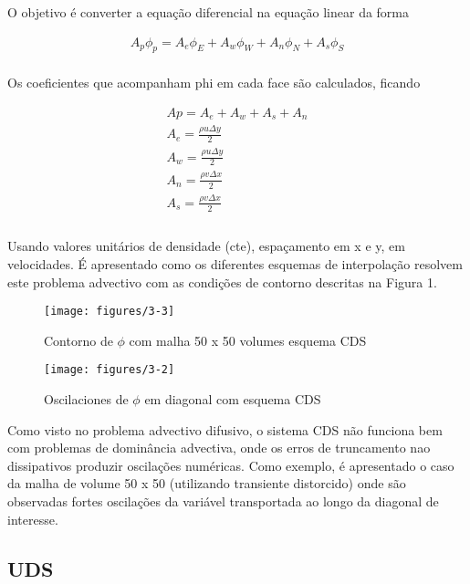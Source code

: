 \documentclass[]{article}
\begin{document}
O objetivo é converter a equação diferencial na equação linear da forma

\begin{equation}
	\begin{aligned}
		A_p\phi_p= A_e\phi_E + A_w\phi_W + A_n\phi_N + A_s\phi_S 
	\end{aligned}
\end{equation}\\

Os coeficientes que acompanham phi em cada face são calculados, ficando

\begin{equation}
	\begin{aligned}
		Ap = A_e + A_w + A_s + A_n\\
		A_e = \frac{\rho u \Delta y}{2}\\
		A_w = \frac{\rho u \Delta y}{2}\\
		A_n = \frac{\rho v \Delta x}{2}\\
		A_s = \frac{\rho v \Delta x}{2}\\
	\end{aligned}
\end{equation}\\

Usando valores unitários de densidade (cte), espaçamento em x e y, em velocidades. É apresentado como os diferentes esquemas de interpolação resolvem este problema advectivo com as condições de contorno descritas na Figura 1.

\begin{figure}[H]
	\centering
	\texttt{[image: figures/3-3]}
	\caption{Contorno de $\phi$ com malha 50 x 50 volumes esquema CDS}
\end{figure}

\begin{figure}[H]
	\centering
	\texttt{[image: figures/3-2]}
	\caption{Oscilaciones de $\phi$ em diagonal com esquema CDS}
\end{figure}


Como visto no problema advectivo difusivo, o sistema CDS não funciona bem com problemas de dominância advectiva, onde os erros de truncamento nao dissipativos produzir oscilações numéricas. Como exemplo, é apresentado o caso da malha de volume 50 x 50 (utilizando transiente distorcido) onde são observadas fortes oscilações da variável transportada ao longo da diagonal de interesse.

\subsection*{UDS}
\end{document}
